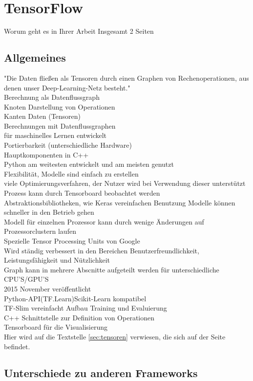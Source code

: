 \chapter{TensorFlow}
\label{chap:tensorflow}
\chapterauthor{\authorNiklas}

Worum geht es in Ihrer Arbeit \citep{Einfuehrung}
Insgesamt 2 Seiten

\section{Allgemeines}
\label{sec:allgemeines}
"Die Daten fließen als Tensoren durch einen Graphen von Rechenoperationen, aus denen unser Deep-Learning-Netz besteht." \citep{Einfuehrung}\\
Berechnung als Datenflussgraph\\
Knoten Darstellung von Operationen\\
Kanten Daten (Tensoren)\\
Berechnungen mit Datenflussgraphen\\
für maschinelles Lernen entwickelt\\
Portierbarkeit (unterschiedliche Hardware)\\
Hauptkomponenten in C++\\
Python am weitesten entwickelt und am meisten genutzt\\
Flexibilität, Modelle sind einfach zu erstellen\\
viele Optimierungsverfahren, der Nutzer wird bei Verwendung dieser unterstützt\\
Prozess kann durch Tensorboard beobachtet werden\\
Abstraktionsbibliotheken, wie Keras vereinfachen Benutzung
Modelle können schneller in den Betrieb gehen\\
Modell für einzelnen Prozessor kann durch wenige Änderungen
auf Prozessorclustern laufen\\
Spezielle Tensor Processing Units von Google\\
Wird ständig verbessert in den Bereichen Benutzerfreundlichkeit, Leistungsfähigkeit und Nützlichkeit\\
Graph kann in mehrere Abscnitte aufgeteilt werden für unterschiedliche CPU'S/GPU'S\\
2015 November veröffentlicht\\
Python-API(TF.Learn)Scikit-Learn kompatibel\\
TF-Slim vereinfacht Aufbau Training und Evaluierung\\
C++ Schnittstelle zur Definition von Operationen\\
Tensorboard für die Visualisierung\\
Hier wird auf die Textstelle \ref{sec:tensoren} verwiesen, die
sich auf der Seite \pageref{sec:tensoren} befindet.

\section{Unterschiede zu anderen Frameworks}
\label{sec:unterschiede}

